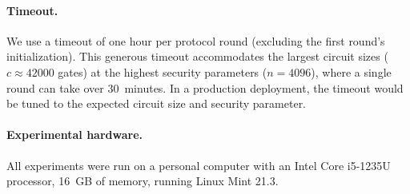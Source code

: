 \paragraph{Timeout.}
We use a timeout of one hour per protocol round (excluding the first round's initialization). This generous timeout accommodates the largest circuit sizes ($c \approx 42000$ gates) at the highest security parameters ($n = 4096$), where a single round can take over 30~minutes. In a production deployment, the timeout would be tuned to the expected circuit size and security parameter.

\paragraph{Experimental hardware.}
All experiments were run on a personal computer with an Intel Core i5-1235U processor, 16~GB of memory, running Linux Mint 21.3.

